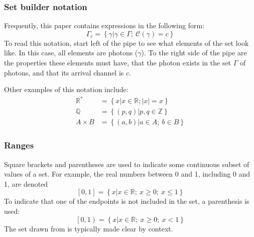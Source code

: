 \documentclass{article}
\newcommand{\braces}[1]{\ensuremath{\left\lbrace #1 \right\rbrace}}
\newcommand{\brackets}[1]{\ensuremath{\left[ #1 \right]}}
\newcommand{\setbuilder}[2]{\ensuremath{\braces{#1 \left| #2 \right.}}}
\newcommand{\integers}{\ensuremath{\mathbb{Z}}}
\newcommand{\reals}{\ensuremath{\mathbb{R}}}
\newcommand{\rationals}{\ensuremath{\mathbb{Q}}}
\newcommand{\abs}[1]{\ensuremath{\left|#1\right|}}
\newcommand{\channel}{\ensuremath{c}}
\newcommand{\Channel}{\ensuremath{\mathcal{C}}}
\newcommand{\photon}{\ensuremath{\gamma}}
\newcommand{\photons}{\ensuremath{\Gamma}}
\begin{document}
\begin{appendix}
\subsubsection{Set builder notation}
Frequently, this paper contains expressions in the following form:
\begin{equation}
\photons_{\channel}=\braces{\photon\left|\photon\in\photons;~\Channel(\photon)=\channel\right.}
\end{equation}
To read this notation, start left of the pipe to see what elements of the set look like. In this case, all elements are photons (\photon). To the right side of the pipe are the properties these elements must have, that the photon exists in the set \photons{} of photons, and that its arrival channel is $c$. 

Other examples of this notation include:
\begin{align}
\reals^{*} &= \setbuilder{x}
                        {x\in\reals; \abs{x}=x} \\
\rationals &= \setbuilder{(p,q)}
                        {p,q\in\integers} \\
A\times B &= \setbuilder{(a,b)}
                       {a\in A;~b\in B}                       
\end{align}

\subsubsection{Ranges}
Square brackets and parentheses are used to indicate some continuous subset of values of a set. For example, the real numbers between 0 and 1, including 0 and 1, are denoted
\begin{equation}
\brackets{0,1} = \setbuilder{x}{x\in\reals;~x\ge 0;~x\le 1}
\end{equation}
To indicate that one of the endpoints is not included in the set, a parenthesis is used:
\begin{equation}
\left[0,1\right) = \setbuilder{x}{x\in\reals;~x\ge 0;~x<1}
\end{equation}
The set drawn from is typically made clear by context.


\end{appendix}
\end{document}
